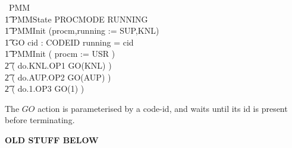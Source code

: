 \begin{circus}
\circprocess\ PMM \circdef \circbegin \\
\t1 \circstate PMMState  PROCMODE \land RUNNING \\
\t1 PMMInit \circdef (procm,running := SUP,KNL) \\
\t1 GO \circdef
   \circval cid : CODEID \circspot
      \lcircguard running = cid \rcircguard \circguard \Skip \\
\t1 \circspot PMMInit \circseq
               ( procm := USR ) \\
\t2 \circseq ( do.KNL.OP1 \then GO(KNL) ) \\
\t2 \circseq ( do.AUP.OP2 \then GO(AUP) ) \\
\t2 \circseq ( do.1.OP3 \then GO(1) )\\
\circend
\end{circus}

The $GO$ action is parameterised by a code-id,
and waits until its id is present before terminating.


\newpage
\textbf{OLD STUFF BELOW}

